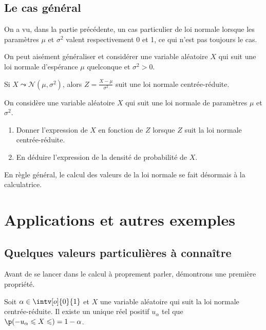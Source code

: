 \documentclass[11pt,a4paper,french]{article}
\begin{document}
\subsection{Le cas général}

On a vu, dans la partie précédente, un cas particulier de loi normale
lorsque les paramètres $\mu$ et $\sigma^2$ valent respectivement 0 et 1,
ce qui n'est pas toujours le cas.

On peut aisément généraliser et considérer une variable aléatoire $X$
qui suit une loi normale d'espérance $\mu$ quelconque et $\sigma^2 > 0$.

\begin{proposition}
  Si $X \leadsto \mathcal{N}(\mu,\sigma^2)$, alors $Z = \frac{ X -
  \mu}{\sigma^2}$ suit une loi normale centrée-réduite.
\end{proposition}

\begin{question}
  On considère une variable aléatoire $X$ qui suit une loi normale de
  paramètres $\mu$ et $\sigma^2$.
  \begin{enumerate}
    \item Donner l'expression de $X$ en fonction de $Z$ lorsque $Z$ suit
      la loi normale centrée-réduite.
    \item En déduire l'expression de la densité de probabilité de $X$.
  \end{enumerate}
\end{question}

En règle général, le calcul des valeurs de la loi normale se fait
désormais à la calculatrice.

\section{Applications et autres exemples}

\subsection{Quelques valeurs particulières à connaître}

Avant de se lancer dans le calcul à proprement parler, démontrons une
première propriété.

\begin{proposition}
  Soit $\alpha \in \intv[o]{0}{1}$ et $X$ une variable aléatoire qui suit
  la loi normale centrée-réduite. Il existe un unique réel positif
  $u_{\alpha}$ tel que $\p(-u_{\alpha} \leqslant X \leqslant) = 1 -
  \alpha$.
\end{proposition}
\end{document}
